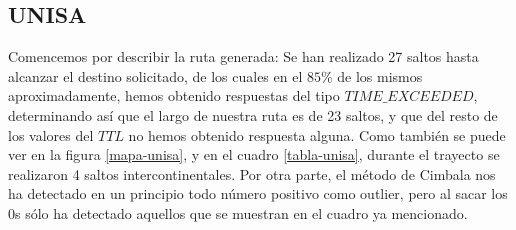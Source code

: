 \subsection{UNISA}


Comencemos por describir la ruta generada:
Se han realizado 27 saltos hasta alcanzar el destino solicitado, de los cuales en el $85 \% $ de los mismos aproximadamente, hemos obtenido respuestas del tipo $TIME\_EXCEEDED$, determinando así que el largo de nuestra ruta es de 23 saltos, y que del resto de los valores del $TTL$ no hemos obtenido respuesta alguna. Como también se puede ver en la figura \ref{mapa-unisa}, y en el cuadro \ref{tabla-unisa}, durante el trayecto se realizaron 4 saltos intercontinentales. Por otra parte, el método de Cimbala nos ha detectado en un principio todo número positivo como outlier, pero al sacar los 0s sólo ha detectado aquellos que se muestran en el cuadro ya mencionado.

